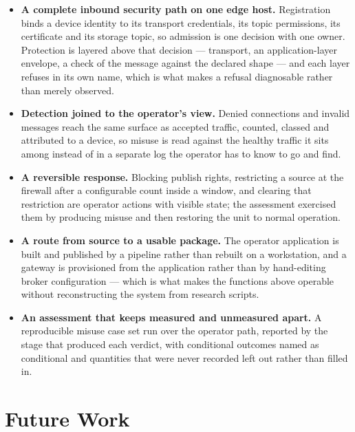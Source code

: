 \documentclass[12pt,a4paper]{report}
\begin{document}
\begin{itemize}
    \item \textbf{A complete inbound security path on one
    edge host.}
    Registration binds a device identity to its transport
    credentials, its topic permissions, its certificate and
    its storage topic, so admission is one decision with one
    owner. Protection is layered above that decision ---
    transport, an application-layer envelope, a check of the
    message against the declared shape --- and each layer
    refuses in its own name, which is what makes a refusal
    diagnosable rather than merely observed.

    \item \textbf{Detection joined to the operator's view.}
    Denied connections and invalid messages reach the same
    surface as accepted traffic, counted, classed and
    attributed to a device, so misuse is read against the
    healthy traffic it sits among instead of in a separate
    log the operator has to know to go and find.

    \item \textbf{A reversible response.}
    Blocking publish rights, restricting a source at the
    firewall after a configurable count inside a window, and
    clearing that restriction are operator actions with
    visible state; the assessment exercised them by producing
    misuse and then restoring the unit to normal operation.

    \item \textbf{A route from source to a usable package.}
    The operator application is built and published by a
    pipeline rather than rebuilt on a workstation, and a
    gateway is provisioned from the application rather than
    by hand-editing broker configuration --- which is what
    makes the functions above operable without
    reconstructing the system from research scripts.

    \item \textbf{An assessment that keeps measured and
    unmeasured apart.}
    A reproducible misuse case set run over the operator path,
    reported by the stage that produced each verdict, with
    conditional outcomes named as conditional and quantities
    that were never recorded left out rather than filled in.
\end{itemize}

\section{Future Work}
\end{document}
